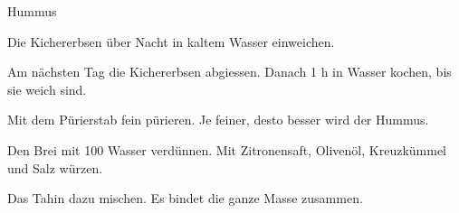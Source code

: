 
\begin{recipe}[]{Hummus}{}{}



\step
Die Kichererbsen \"uber Nacht in kaltem Wasser einweichen.

\step
Am n\"achsten Tag die Kichererbsen abgiessen. Danach 1 h in Wasser kochen, bis sie weich sind.


\step
Mit dem P\"urierstab fein p\"urieren. Je feiner, desto besser wird der Hummus.

\step
Den Brei mit 100 \ml Wasser verd\"unnen. Mit Zitronensaft, Oliven\"ol, Kreuzk\"ummel und Salz w\"urzen.

\step
Das Tahin dazu mischen. Es bindet die ganze Masse zusammen.


\end{recipe}